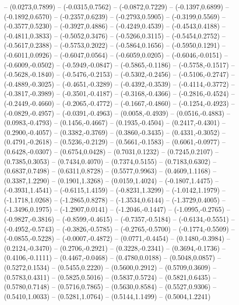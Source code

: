 {	-- (0.0273,0.7899)
	-- (-0.0315,0.7562)
	-- (-0.0872,0.7229)
	-- (-0.1397,0.6899)
	-- (-0.1892,0.6570)
	-- (-0.2357,0.6239)
	-- (-0.2793,0.5905)
	-- (-0.3199,0.5569)
	-- (-0.3577,0.5230)
	-- (-0.3927,0.4886)
	-- (-0.4249,0.4539)
	-- (-0.4543,0.4188)
	-- (-0.4811,0.3833)
	-- (-0.5052,0.3476)
	-- (-0.5266,0.3115)
	-- (-0.5454,0.2752)
	-- (-0.5617,0.2388)
	-- (-0.5753,0.2022)
	-- (-0.5864,0.1656)
	-- (-0.5950,0.1291)
	-- (-0.6011,0.0926)
	-- (-0.6047,0.0564)
	-- (-0.6059,0.0205)
	-- (-0.6046,-0.0151)
	-- (-0.6009,-0.0502)
	-- (-0.5949,-0.0847)
	-- (-0.5865,-0.1186)
	-- (-0.5758,-0.1517)
	-- (-0.5628,-0.1840)
	-- (-0.5476,-0.2153)
	-- (-0.5302,-0.2456)
	-- (-0.5106,-0.2747)
	-- (-0.4889,-0.3025)
	-- (-0.4651,-0.3289)
	-- (-0.4392,-0.3539)
	-- (-0.4114,-0.3772)
	-- (-0.3817,-0.3989)
	-- (-0.3501,-0.4187)
	-- (-0.3168,-0.4366)
	-- (-0.2816,-0.4524)
	-- (-0.2449,-0.4660)
	-- (-0.2065,-0.4772)
	-- (-0.1667,-0.4860)
	-- (-0.1254,-0.4923)
	-- (-0.0829,-0.4957)
	-- (-0.0391,-0.4963)
	-- (0.0058,-0.4939)
	-- (0.0516,-0.4883)
	-- (0.0983,-0.4793)
	-- (0.1456,-0.4667)
	-- (0.1935,-0.4504)
	-- (0.2417,-0.4301)
	-- (0.2900,-0.4057)
	-- (0.3382,-0.3769)
	-- (0.3860,-0.3435)
	-- (0.4331,-0.3052)
	-- (0.4791,-0.2618)
	-- (0.5236,-0.2129)
	-- (0.5661,-0.1583)
	-- (0.6061,-0.0977)
	-- (0.6428,-0.0307)
	-- (0.6754,0.0428)
	-- (0.7031,0.1232)
	-- (0.7245,0.2107)
	-- (0.7385,0.3053)
	-- (0.7434,0.4070)
	-- (0.7374,0.5155)
	-- (0.7183,0.6302)
	-- (0.6837,0.7498)
	-- (0.6311,0.8728)
	-- (0.5577,0.9963)
	-- (0.4609,1.1168)
	-- (0.3387,1.2290)
	-- (0.1901,1.3268)
	-- (0.0159,1.4024)
	-- (-0.1807,1.4475)
	-- (-0.3931,1.4541)
	-- (-0.6115,1.4159)
	-- (-0.8231,1.3299)
	-- (-1.0142,1.1979)
	-- (-1.1718,1.0268)
	-- (-1.2865,0.8278)
	-- (-1.3534,0.6144)
	-- (-1.3729,0.4005)
	-- (-1.3496,0.1975)
	-- (-1.2907,0.0141)
	-- (-1.2046,-0.1447)
	-- (-1.0995,-0.2765)
	-- (-0.9827,-0.3816)
	-- (-0.8599,-0.4615)
	-- (-0.7357,-0.5184)
	-- (-0.6134,-0.5551)
	-- (-0.4952,-0.5743)
	-- (-0.3826,-0.5785)
	-- (-0.2765,-0.5700)
	-- (-0.1774,-0.5509)
	-- (-0.0855,-0.5228)
	-- (-0.0007,-0.4872)
	-- (0.0771,-0.4454)
	-- (0.1480,-0.3984)
	-- (0.2124,-0.3470)
	-- (0.2706,-0.2921)
	-- (0.3228,-0.2341)
	-- (0.3694,-0.1736)
	-- (0.4106,-0.1111)
	-- (0.4467,-0.0468)
	-- (0.4780,0.0188)
	-- (0.5048,0.0857)
	-- (0.5272,0.1534)
	-- (0.5455,0.2220)
	-- (0.5600,0.2912)
	-- (0.5709,0.3609)
	-- (0.5783,0.4311)
	-- (0.5825,0.5016)
	-- (0.5837,0.5724)
	-- (0.5821,0.6435)
	-- (0.5780,0.7148)
	-- (0.5716,0.7865)
	-- (0.5630,0.8584)
	-- (0.5527,0.9306)
	-- (0.5410,1.0033)
	-- (0.5281,1.0764)
	-- (0.5144,1.1499)
	-- (0.5004,1.2241)
}
